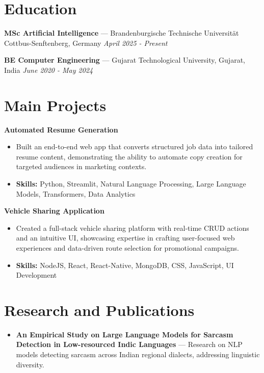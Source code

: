 \documentclass[a4paper,10pt]{article}
\begin{document}
\section*{Education}
\textbf{MSc Artificial Intelligence} — Brandenburgische Technische Universität Cottbus-Senftenberg, Germany \hfill \textit{April 2025 - Present}\par
\vspace{1.5pt}
\textbf{BE Computer Engineering} — Gujarat Technological University, Gujarat, India \hfill \textit{June 2020 - May 2024}\par

\section*{Main Projects}
\textbf{Automated Resume Generation}\par
\vspace{1pt}
\begin{itemize}
  \item Built an end-to-end web app that converts structured job data into tailored resume content, demonstrating the ability to automate copy creation for targeted audiences in marketing contexts.
  \item \textbf{Skills:} Python, Streamlit, Natural Language Processing, Large Language Models, Transformers, Data Analytics
\end{itemize}
\vspace{3pt}
\textbf{Vehicle Sharing Application}\par
\vspace{1pt}
\begin{itemize}
  \item Created a full-stack vehicle sharing platform with real-time CRUD actions and an intuitive UI, showcasing expertise in crafting user-focused web experiences and data-driven route selection for promotional campaigns.
  \item \textbf{Skills:} NodeJS, React, React-Native, MongoDB, CSS, JavaScript, UI Development
\end{itemize}

\section*{Research and Publications}
\begin{itemize}
\item \textbf{An Empirical Study on Large Language Models for Sarcasm Detection in Low-resourced Indic Languages} — Research on NLP models detecting sarcasm across Indian regional dialects, addressing linguistic diversity.
\end{itemize}
\end{document}
